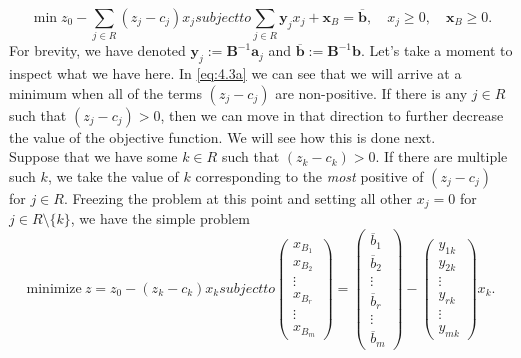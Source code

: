 \documentclass[12pt,english]{article}
\begin{document}
\begin{subequations}\label{eq:4.3a}
\begin{equation}
\min z_0 - \sum_{j \in R} (z_j - c_j) x_j
\end{equation}
subject to
\begin{equation}\label{eq:4.3b}
\sum_{j \in R} \mathbf{y}_jx_j + \mathbf{x}_B = \overline{\mathbf{b}}, \quad x_j \geq 0, \quad \mathbf{x}_B \geq 0.
\end{equation}
\end{subequations}
For brevity, we have denoted $\mathbf{y}_j := \mathbf{B}^{-1} \mathbf{a}_j$ and $\overline{\mathbf{b}}:= \mathbf{B}^{-1}\mathbf{b}$.  Let's take a moment to inspect what we have here.  In \eqref{eq:4.3a} we can see that we will arrive at a minimum when all of the terms $(z_j - c_j)$ are non-positive.  If there is any $j \in R$ such that $(z_j - c_j) >0$, then we can move in that direction to further decrease the value of the objective function.  We will see how this is done next. \\

Suppose that we have some $k \in R$ such that $(z_k - c_k)>0$.  If there are multiple such $k$, we take the value of $k$ corresponding to the {\it most} positive of $(z_j - c_j)$ for $j \in R$.  Freezing the problem at this point and setting all other $x_j = 0$ for $j \in R \setminus \{k\}$, we have the simple problem
\begin{subequations}
\begin{equation}\label{eq:4.4}
\text{minimize} ~ z = z_0 - (z_k - c_k)x_k
\end{equation}
subject to 
\begin{equation}\label{eq:4.5}
\left(
\begin{array}{c}
x_{B_1} \\
x_{B_2} \\
\vdots \\
x_{B_r} \\
\vdots \\
x_{B_m}
\end{array}
\right)
=
\left(
\begin{array}{c}
\overline{b}_1 \\
\overline{b}_2 \\
\vdots \\
\overline{b}_r \\
\vdots \\
\overline{b}_m
\end{array}
\right)
-
\left(
\begin{array}{c}
y_{1k} \\
y_{2k} \\
\vdots  \\
y_{rk} \\
\vdots \\
y_{mk}
\end{array}
\right)
x_k.
\end{equation}
\end{subequations}
\end{document}
